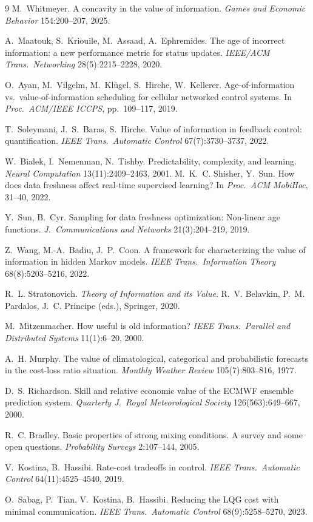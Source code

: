 \documentclass[acmsmall,screen,review,anonymous]{acmart}
\begin{document}
\begin{thebibliography}{9}
M.~Whitmeyer. A concavity in the value of information.
\emph{Games and Economic Behavior} 154:200--207, 2025.

A.~Maatouk, S.~Kriouile, M.~Assaad, A.~Ephremides. The age of incorrect
information: a new performance metric for status updates.
\emph{IEEE/ACM Trans.\ Networking} 28(5):2215--2228, 2020.

O.~Ayan, M.~Vilgelm, M.~Kl\"ugel, S.~Hirche, W.~Kellerer.
Age-of-information vs.\ value-of-information scheduling for cellular
networked control systems. In \emph{Proc.\ ACM/IEEE ICCPS}, pp.~109--117, 2019.

T.~Soleymani, J.~S.~Baras, S.~Hirche. Value of information in
feedback control: quantification.
\emph{IEEE Trans.\ Automatic Control} 67(7):3730--3737, 2022.

W.~Bialek, I.~Nemenman, N.~Tishby. Predictability, complexity, and
learning. \emph{Neural Computation} 13(11):2409--2463, 2001.
M.~K.~C. Shisher, Y.~Sun. How does data freshness affect real-time
supervised learning? In \emph{Proc.\ ACM MobiHoc}, 31--40, 2022.

Y.~Sun, B.~Cyr. Sampling for data freshness optimization: Non-linear age
functions. \emph{J.\ Communications and Networks} 21(3):204--219, 2019.

Z.~Wang, M.-A.~Badiu, J.~P.~Coon. A framework for characterizing the
value of information in hidden Markov models. \emph{IEEE Trans.\
Information Theory} 68(8):5203--5216, 2022.

R.~L. Stratonovich. \emph{Theory of Information and its Value}.
R.~V. Belavkin, P.~M. Pardalos, J.~C. Principe (eds.), Springer, 2020.

M.~Mitzenmacher. How useful is old information? \emph{IEEE Trans.\
Parallel and Distributed Systems} 11(1):6--20, 2000.

A.~H. Murphy. The value of climatological, categorical and probabilistic
forecasts in the cost-loss ratio situation. \emph{Monthly Weather Review}
105(7):803--816, 1977.

D.~S. Richardson. Skill and relative economic value of the ECMWF ensemble
prediction system. \emph{Quarterly J.\ Royal Meteorological Society}
126(563):649--667, 2000.

R.~C. Bradley. Basic properties of strong mixing conditions. A survey and
some open questions. \emph{Probability Surveys} 2:107--144, 2005.

\bibitem{kostinahassibi19}
V.~Kostina, B.~Hassibi. Rate-cost tradeoffs in control. \emph{IEEE Trans.\
Automatic Control} 64(11):4525--4540, 2019.

\bibitem{sabag23}
O.~Sabag, P.~Tian, V.~Kostina, B.~Hassibi. Reducing the LQG cost with
minimal communication. \emph{IEEE Trans.\ Automatic Control}
68(9):5258--5270, 2023.

\end{thebibliography}
\end{document}
